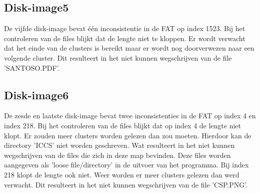 \documentclass[11pt]{article}
\begin{document}
	\subsection{Disk-image5}\label{sec:disk5}
	De vijfde disk-image bevat \'e\'en inconsistentie in de FAT op index 1523. Bij het controleren van de files blijkt dat de lengte niet te kloppen. Er wordt verwacht dat het einde van de clusters is bereikt maar er wordt nog doorverwezen naar een volgende cluster. Dit resulteert in het niet kunnen wegschrijven van de file 'SANTOSO.PDF'.

	\subsection{Disk-image6}\label{sec:disk6}
	De zesde en laatste disk-image bevat twee inconsistenties in de FAT op index 4 en index 218. Bij het controleren van de files blijkt dat op index 4 de lengte niet klopt. Er zouden meer clusters worden gelezen dan zou moeten. Hierdoor kan de directory 'ICCS' niet worden geschreven. Wat resulteert in het niet kunnen wegschrijven van de files die zich in deze map bevinden. Deze files worden aangegeven als 'loose file/directory' in de uitvoer van het programma. Bij index 218 klopt de lengte ook niet. Weer worden er meer clusters gelezen dan werd verwacht. Dit resulteert in het niet kunnen wegschrijven van de file 'CSP.PNG'.
\end{document}
